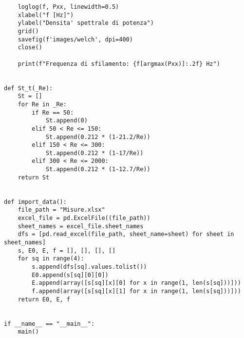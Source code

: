 \begin{lstlisting}
    loglog(f, Pxx, linewidth=0.5)
    xlabel("f [Hz]")
    ylabel("Densita' spettrale di potenza")
    grid()
    savefig(f'images/welch', dpi=400)
    close()

    print(f"Frequenza di sfilamento: {f[argmax(Pxx)]:.2f} Hz")
    

def St_t(_Re):
    St = []
    for Re in _Re:
        if Re == 50:
            St.append(0)
        elif 50 < Re <= 150:
            St.append(0.212 * (1-21.2/Re))
        elif 150 < Re <= 300:
            St.append(0.212 * (1-17/Re))
        elif 300 < Re <= 2000:
            St.append(0.212 * (1-12.7/Re))
    return St


def import_data():
    file_path = "Misure.xlsx"
    excel_file = pd.ExcelFile((file_path))
    sheet_names = excel_file.sheet_names
    dfs = [pd.read_excel(file_path, sheet_name=sheet) for sheet in sheet_names]
    s, E0, E, f = [], [], [], []
    for sq in range(4):
        s.append(dfs[sq].values.tolist())
        E0.append(s[sq][0][0])
        E.append(array([s[sq][x][0] for x in range(1, len(s[sq]))]))
        f.append(array([s[sq][x][1] for x in range(1, len(s[sq]))]))
    return E0, E, f


if __name__ == "__main__":
    main()
\end{lstlisting}

